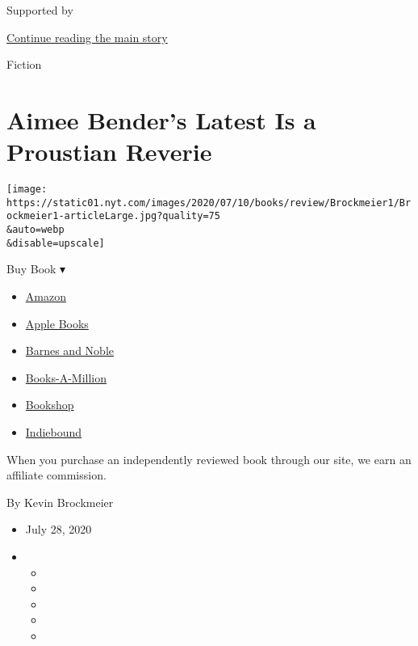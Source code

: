 Supported by

\protect\hyperlink{after-sponsor}{Continue reading the main story}

Fiction

\hypertarget{aimee-benders-latest-is-a-proustian-reverie}{%
\section{Aimee Bender's Latest Is a Proustian
Reverie}\label{aimee-benders-latest-is-a-proustian-reverie}}

\texttt{[image: https://static01.nyt.com/images/2020/07/10/books/review/Brockmeier1/Brockmeier1-articleLarge.jpg?quality=75\\\&auto=webp\\\&disable=upscale]}

Buy Book ▾

\begin{itemize}
\tightlist
\item
  \href{https://www.amazon.com/gp/search?index=books\&tag=NYTBSREV-20\&field-keywords=The+Butterfly+Lampshade+Aimee+Bender}{Amazon}
\item
  \href{https://du-gae-books-dot-nyt-du-prd.appspot.com/buy?title=The+Butterfly+Lampshade\&author=Aimee+Bender}{Apple
  Books}
\item
  \href{https://www.anrdoezrs.net/click-7990613-11819508?url=https\%3A\%2F\%2Fwww.barnesandnoble.com\%2Fw\%2F\%3Fean\%3D9780385534871}{Barnes
  and Noble}
\item
  \href{https://www.anrdoezrs.net/click-7990613-35140?url=https\%3A\%2F\%2Fwww.booksamillion.com\%2Fp\%2FThe\%2BButterfly\%2BLampshade\%2FAimee\%2BBender\%2F9780385534871}{Books-A-Million}
\item
  \href{https://bookshop.org/a/3546/9780385534871}{Bookshop}
\item
  \href{https://www.indiebound.org/book/9780385534871?aff=NYT}{Indiebound}
\end{itemize}

When you purchase an independently reviewed book through our site, we
earn an affiliate commission.

By Kevin Brockmeier

\begin{itemize}
\item
  July 28, 2020
\item
  \begin{itemize}
  \item
  \item
  \item
  \item
  \item
  \end{itemize}
\end{itemize}

